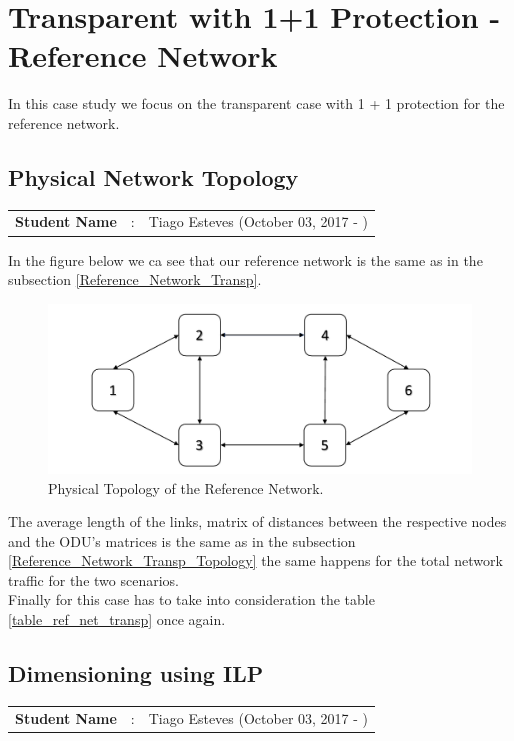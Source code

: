 \clearpage

\section{Transparent with 1+1 Protection - Reference Network}
In this case study we focus on the transparent case with 1 + 1 protection for the reference network.

\subsection{Physical Network Topology}
\begin{tcolorbox}	
\begin{tabular}{p{2.75cm} p{0.2cm} p{10.5cm}} 	
\textbf{Student Name}  &:& Tiago Esteves    (October 03, 2017 - )\\
\end{tabular}
\end{tcolorbox}

In the figure below we ca see that our reference network is the same as in the subsection \ref{Reference_Network_Transp}.

\begin{figure}[h!]
\centering
\includegraphics[width=\textwidth]{sdf/transparent/figures/RedeTeste}
\caption{Physical Topology of the Reference Network.}
\end{figure}

The average length of the links, matrix of distances between the respective nodes and the ODU's matrices is the same as in the subsection \ref{Reference_Network_Transp_Topology} the same happens for the total network traffic for the two scenarios.\\

Finally for this case has to take into consideration the table \ref{table_ref_net_transp} once again.


\subsection{Dimensioning using ILP}
\begin{tcolorbox}	
\begin{tabular}{p{2.75cm} p{0.2cm} p{10.5cm}} 	
\textbf{Student Name}  &:& Tiago Esteves    (October 03, 2017 - )\\
\end{tabular}
\end{tcolorbox}


